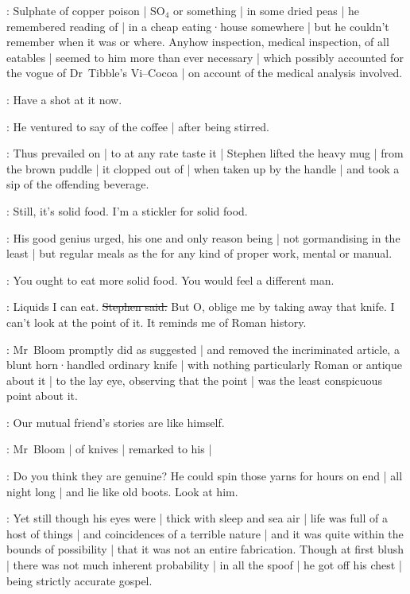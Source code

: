:
Sulphate of copper poison |
SO$_4$ or something |
in some dried peas |
he remembered reading of |
in a cheap eating·house somewhere |
but he couldn't remember when it was or where.
Anyhow inspection,
medical inspection,
of all eatables |
seemed to him more than ever necessary |
which possibly accounted for the vogue of Dr~Tibble's Vi--Cocoa |
on account of the medical analysis involved.

\Bloom:
Have a shot at it now.

:
He ventured to say of the coffee |
after being stirred.

:
Thus prevailed on |
to at any rate taste it |
Stephen lifted the heavy mug |
from the brown puddle |
it clopped out of |
when taken up by the handle |
and took a sip of the offending beverage.%

\Bloom:
Still,
it's solid food.
I'm a stickler for solid food.

:
His good genius urged,
his one and only reason being |
not gormandising in the least |
but regular meals as the  for any kind of proper work,
mental or manual.

\Bloom:
You ought to eat more solid food.
You would feel a different man.

\Stephen:
Liquids I can eat.
\sout{Stephen said.}
But O,
oblige me by taking away that knife.
I can't look at the point of it.
It reminds me of Roman history.

:
Mr~Bloom promptly did as suggested |
and removed the incriminated article,
a blunt horn·handled ordinary knife |
with nothing particularly Roman or antique about it |
to the lay eye,
observing that the point |
was the least conspicuous point
about it.

\Bloom:
Our mutual friend's stories are like himself.

:
Mr~Bloom |
 of knives |
remarked to his  |

\Bloom:
Do you think they are genuine?
He could spin those yarns for hours on end |
all night long |
and lie like old boots.
Look at him.

:
Yet still though his eyes were |
thick with sleep and sea air |
life was full of a host of things |
and coincidences of a terrible nature |
and it was quite within the bounds of possibility |
that it was not an entire fabrication.
Though at first blush |
there was not much inherent probability |
in all the spoof |
he got off his chest |
being strictly accurate gospel.

